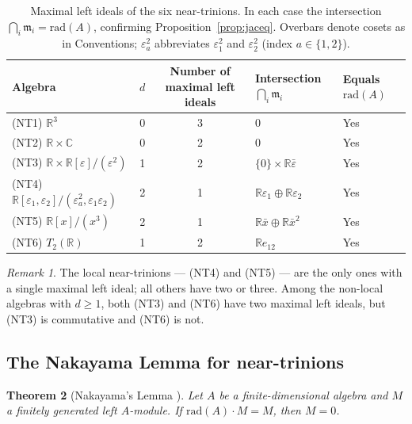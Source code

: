 \documentclass{amsart}
\theoremstyle{plain}
\newtheorem{theorem}{Theorem}[section]
\theoremstyle{definition}
\theoremstyle{remark}
\newtheorem{remark}[theorem]{Remark}
\newcommand{\RR}{\mathbb{R}}
\newcommand{\CC}{\mathbb{C}}
\newcommand{\Jac}{\mathrm{rad}}
\begin{document}
\begin{table}[h]
\caption{Maximal left ideals of the six near-trinions. In each case the
intersection $\bigcap_i \mathfrak{m}_i = \Jac(A)$, confirming
Proposition~\ref{prop:jaceq}. Overbars denote cosets as in Conventions;
$\varepsilon_a^2$ abbreviates $\varepsilon_1^2$ and $\varepsilon_2^2$
(index $a \in \{1,2\}$).}
\label{tab:maxideals}
\renewcommand{\arraystretch}{1.35}
\begin{tabular}{lccll}
  \toprule
  Algebra & $d$ & Number of maximal left ideals &
  Intersection $\bigcap_i \mathfrak{m}_i$ & Equals $\Jac(A)$\\
  \midrule
  \textup{(NT1)} $\RR^3$   & 0 & 3 & $0$                              & Yes \\
  \textup{(NT2)} $\RR\times\CC$  & 0 & 2 & $0$                        & Yes \\
  \textup{(NT3)} $\RR \times \RR[\varepsilon]/(\varepsilon^2)$
                           & 1 & 2 & $\{0\}\times\RR\bar\varepsilon$   & Yes \\
  \textup{(NT4)} $\RR[\varepsilon_1,\varepsilon_2]/(\varepsilon_a^2,\varepsilon_1\varepsilon_2)$
                           & 2 & 1 & $\RR \varepsilon_1\oplus\RR \varepsilon_2$            & Yes \\
  \textup{(NT5)} $\RR[x]/(x^3)$
                           & 2 & 1 & $\RR\bar x\oplus\RR\bar x^2$      & Yes \\
  \textup{(NT6)} $T_2(\RR)$ & 1 & 2 & $\RR e_{12}$                    & Yes \\
  \bottomrule
\end{tabular}
\end{table}

\begin{remark}
  The local near-trinions --- (NT4) and (NT5) --- are the only ones with
  a single maximal left ideal; all others have two or three.
  Among the non-local algebras with $d \geq 1$, both (NT3) and (NT6)
  have two maximal left ideals, but (NT3) is commutative and (NT6) is not.
\end{remark}

\subsection{The Nakayama Lemma for near-trinions}
\label{sec:nakayama}

\begin{theorem}[Nakayama's Lemma {\cite{Pierce1982}}]
  \label{thm:nakayama}
  Let $A$ be a finite-dimensional algebra and $M$ a finitely generated
  left $A$-module.
  If $\Jac(A) \cdot M = M$, then $M = 0$.
\end{theorem}
\end{document}
